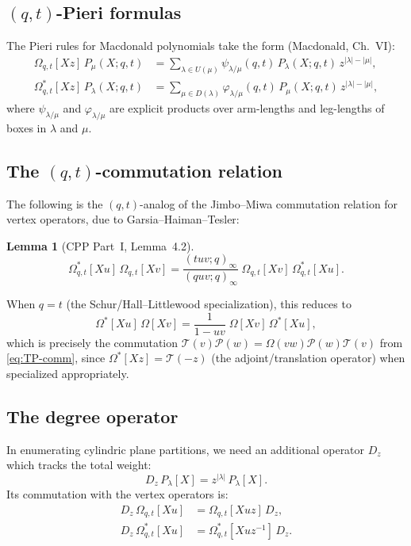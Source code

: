 \documentclass[11pt]{article}
\theoremstyle{plain}
\newtheorem{lemma}[theorem]{Lemma}
\theoremstyle{definition}
\begin{document}
\subsection{$(q,t)$-Pieri formulas}
The Pieri rules for Macdonald polynomials take the form (Macdonald, Ch.~VI):
\begin{align}
\Omega_{q,t}[Xz]\, P_\mu(X;q,t) &= \sum_{\lambda \in U(\mu)} \psi_{\lambda/\mu}(q,t)\, P_\lambda(X;q,t)\, z^{|\lambda|-|\mu|}, \label{eq:qt-pieri1}\\
\Omega^*_{q,t}[Xz]\, P_\lambda(X;q,t) &= \sum_{\mu \in D(\lambda)} \varphi_{\lambda/\mu}(q,t)\, P_\mu(X;q,t)\, z^{|\lambda|-|\mu|}, \label{eq:qt-pieri2}
\end{align}
where $\psi_{\lambda/\mu}$ and $\varphi_{\lambda/\mu}$ are explicit products over arm-lengths and leg-lengths of boxes in $\lambda$ and $\mu$.

\subsection{The $(q,t)$-commutation relation}\label{sec:qt-comm}
The following is the $(q,t)$-analog of the Jimbo--Miwa commutation relation for vertex operators, due to Garsia--Haiman--Tesler:

\begin{lemma}[CPP Part~I, Lemma~4.2]\label{lem:qt-comm}
\begin{equation}\label{eq:qt-comm}
\Omega^*_{q,t}[Xu]\, \Omega_{q,t}[Xv] = \frac{(tuv;q)_\infty}{(quv;q)_\infty}\; \Omega_{q,t}[Xv]\, \Omega^*_{q,t}[Xu].
\end{equation}
\end{lemma}

When $q = t$ (the Schur/Hall--Littlewood specialization), this reduces to
\[
\Omega^*[Xu]\, \Omega[Xv] = \frac{1}{1-uv}\; \Omega[Xv]\, \Omega^*[Xu],
\]
which is precisely the commutation $\mathcal{T}(v)\mathcal{P}(w) = \Omega(vw)\mathcal{P}(w)\mathcal{T}(v)$ from \eqref{eq:TP-comm},
since $\Omega^*[Xz] = \mathcal{T}(-z)$ (the adjoint/translation operator) when specialized appropriately.

\subsection{The degree operator}
In enumerating cylindric plane partitions, we need an additional operator $D_z$ which tracks the total weight:
\[
D_z\, P_\lambda[X] = z^{|\lambda|}\, P_\lambda[X].
\]
Its commutation with the vertex operators is:
\begin{align}
D_z\, \Omega_{q,t}[Xu] &= \Omega_{q,t}[Xuz]\, D_z, \label{eq:Dz-comm1}\\
D_z\, \Omega^*_{q,t}[Xu] &= \Omega^*_{q,t}[Xuz^{-1}]\, D_z. \label{eq:Dz-comm2}
\end{align}
\end{document}

